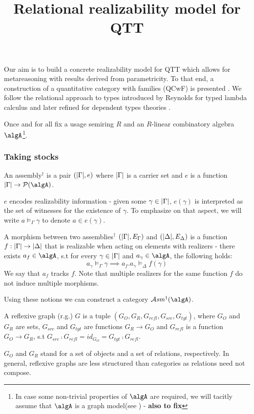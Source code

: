 \documentclass[12pt,a4paper]{article}
\title{\vspace{-5em} Relational realizability model for QTT}
\date{\vspace{-3em}}
\def\cAsm{\mathcal{A}\mathit{sm}^\dagger}
\def\src{_{src}}\alwaysmath{src}
\def\rfl{_{refl}}\alwaysmath{rfl}
\def\tgt{_{tgt}}\alwaysmath{tgt}
\renewcommand{\O}{_{O}}\alwaysmath{O}
\def\R{_{R}}\alwaysmath{R}
\begin{document}
\maketitle

Our aim is to build a concrete realizability model for QTT which allows for metareasoning with results derived from parametricity. To that end, a construction of a quantitative category with families (QCwF) is presented \cite{Atkey2018}. We follow the relational approach to types introduced by Reynolds for typed lambda calculus \cite{Ma1992} and later refined for dependent types theories \cite{Atkey2014a}.


Once and for all fix a usage semiring $R$ and an $R$-linear combinatory algebra $\algA$\footnote{In case some non-trivial properties of $\algA$ are required, we will tacitly assume that $\algA$ is a graph model(see \cite{fill}) - \textbf{also to fix}}.

\subsubsection*{Taking stocks}
\begin{definition}
  An assembly$^\dagger$ \Gamma is a pair $(|\Gamma|, e)$ where $|\Gamma|$ is a carrier set and  $e$ is a function $\carr\Gamma \to \pow(\algA)$.
\end{definition}

$e$ encodes realizability information - given some $\gamma \in |\Gamma|$, $e(\gamma)$ is interpreted as the set of witnesses for the existence of $\gamma$. To emphasize on that aspect, we will write $a \vDash_\Gamma \gamma$ to denote $a \in e(\gamma)$.

A morphism between two assemblies$^\dagger$ $(|\Gamma|, E_\Gamma)$ and $(|\Delta|, E_\Delta)$ is a function $f : |\Gamma| \to |\Delta|$ that is realizable when acting on elements with realizers - there exists $a_f \in \algA$, s.t for every $\gamma \in |\Gamma|$ and $a_\gamma \in \algA$, the following holds:
$$ a_\gamma \vDash_\Gamma \gamma \implies a_f . a_\gamma \vDash_\Delta f(\gamma) $$
We say that $a_f$ tracks $f$. Note that multiple realizers for the same function $f$ do not induce multiple morphisms.

Using these notions we can construct a category $\cAsm(\algA)$.

\begin{definition}
  \label{def:refl-graph}
  A reflexive graph (r.g.) $G$ is a tuple $(G\O, G\R, G\rfl, G\src, G\tgt)$, where $G_O$ and $G_R$ are sets, $G\src$ and $G\tgt$ are functions $G\R \to G\O$ and $G\rfl$ is a function $G\O \to G\R$, s.t $G\src \comp G\rfl = id_{G\O} = G\tgt \comp G\rfl$.
\end{definition}
$G\O$ and $G\R$ stand for a set of objects and a set of relations, respectively. In general, reflexive graphs are less structured than categories as relations need not compose. \\
\end{document}
